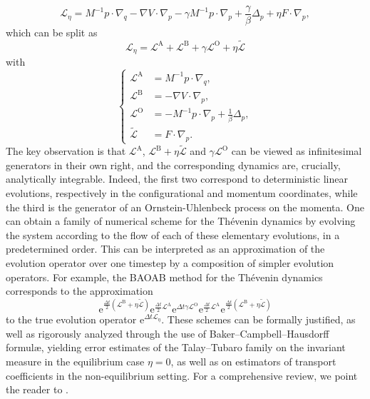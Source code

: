 \documentclass[pdflatex,sn-mathphys]{sn-jnl}%
\theoremstyle{thmstyleone}%
\theoremstyle{thmstyletwo}%
\theoremstyle{thmstylethree}%
\newcommand{\cL}{\mathcal{L}}
\newcommand{\1}{\mathbbm{1}}
\newcommand{\Dt}{{\Delta t}}
\renewcommand{\e}{\mathrm{e}}
\begin{document}
\begin{equation}
    \label{eq:thevenin_generator}
    \cL_{\eta} = M^{-1}p \cdot \nabla_q -\nabla V\cdot \nabla_p - \gamma M^{-1}p \cdot \nabla_p + \frac{\gamma}{\beta}\Delta_p +\eta F\cdot \nabla_p,
\end{equation}
which can be split as
\[\cL_{\eta} = \cL^{\mathrm{A}} + \cL^{\mathrm{B}} +\gamma\cL^{\mathrm{O}} +\eta \widetilde{\cL}\]
with 
\begin{equation}
    \label{eq:thevenin_generator_splitting_parts}
    \left\{
    \begin{aligned}
    \cL^{\mathrm{A}}&=M^{-1}p\cdot \nabla_q,\\
    \cL^{\mathrm{B}}&=-\nabla V\cdot \nabla_p,\\
    \cL^{\mathrm{O}}&=-M^{-1}p\cdot \nabla_p +\frac{1}{\beta}\Delta_p,\\
    \widetilde{\cL}&=F\cdot\nabla_p.
    \end{aligned}\right.
\end{equation}
The key observation is that $\cL^{\mathrm{A}}$, $\cL^{\mathrm{B}}+\eta\widetilde{\cL}$ and $\gamma\cL^{\mathrm{O}}$ can be viewed as infinitesimal generators in their own right, and the corresponding dynamics are, crucially, analytically integrable. Indeed, the first two correspond to deterministic linear evolutions, respectively in the configurational and momentum coordinates, while the third is the generator of an Ornstein-Uhlenbeck process on the momenta. One can obtain a family of numerical scheme for the Th\'evenin dynamics by evolving the system according to the flow of each of these elementary evolutions, in a predetermined order. This can be interpreted as an approximation of the evolution operator over one timestep by a composition of simpler evolution operators. For example, the BAOAB method for the Th\'evenin dynamics corresponds to the approximation
\[\e^{\frac{\Dt}2\left(\cL^{\mathrm{B}}+\eta\widetilde{\cL}\right)}\e^{\frac\Dt2\cL^{\mathrm{A}}}\e^{\Dt\gamma\cL^{\mathrm{O}}}\e^{\frac\Dt2\cL^{\mathrm{A}}}\e^{\frac{\Dt}2\left(\cL^{\mathrm{B}}+\eta\widetilde{\cL}\right)}\]
to the true evolution operator $\e^{\Dt\cL_\eta}.$
These schemes can be formally justified, as well as rigorously analyzed through the use of Baker--Campbell--Hausdorff formul\ae, yielding error estimates of the Talay--Tubaro family on the invariant measure in the equilibrium case $\eta=0$, as well as on estimators of transport coefficients in the non-equilibrium setting. For a comprehensive review, we point the reader to \cite{leimkhuler-stoltz ima numerical analysis}.
\end{document}
